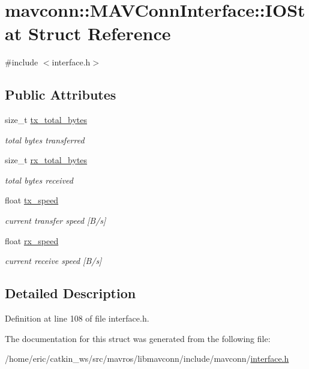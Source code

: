 \hypertarget{structmavconn_1_1MAVConnInterface_1_1IOStat}{}\section{mavconn\+::M\+A\+V\+Conn\+Interface\+::I\+O\+Stat Struct Reference}
\label{structmavconn_1_1MAVConnInterface_1_1IOStat}


{\ttfamily \#include $<$interface.\+h$>$}

\subsection*{Public Attributes}
\begin{DoxyCompactItemize}
\item 
size\+\_\+t \mbox{\hyperlink{group__mavconn_ga941de0f0d1968c6b2d272d5834d8f526}{tx\+\_\+total\+\_\+bytes}}
\begin{DoxyCompactList}\small\item\em total bytes transferred \end{DoxyCompactList}\item 
size\+\_\+t \mbox{\hyperlink{group__mavconn_ga3f5e58792c58b0400dcd903c821e97cb}{rx\+\_\+total\+\_\+bytes}}
\begin{DoxyCompactList}\small\item\em total bytes received \end{DoxyCompactList}\item 
float \mbox{\hyperlink{group__mavconn_gadbe490b44c012f629ee0dc0302c17a8b}{tx\+\_\+speed}}
\begin{DoxyCompactList}\small\item\em current transfer speed \mbox{[}B/s\mbox{]} \end{DoxyCompactList}\item 
float \mbox{\hyperlink{group__mavconn_gaf125917de0e57f9f394f038c71799fa0}{rx\+\_\+speed}}
\begin{DoxyCompactList}\small\item\em current receive speed \mbox{[}B/s\mbox{]} \end{DoxyCompactList}\end{DoxyCompactItemize}


\subsection{Detailed Description}


Definition at line 108 of file interface.\+h.



The documentation for this struct was generated from the following file\+:\begin{DoxyCompactItemize}
\item 
/home/eric/catkin\+\_\+ws/src/mavros/libmavconn/include/mavconn/\mbox{\hyperlink{interface_8h}{interface.\+h}}\end{DoxyCompactItemize}
